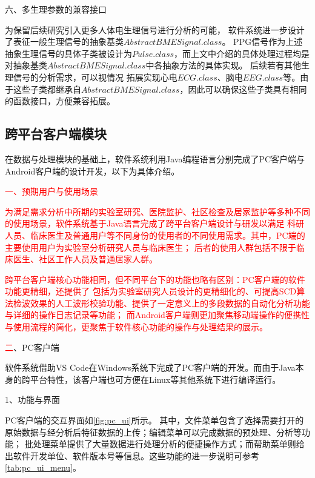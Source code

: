六、多生理参数的兼容接口

为保留后续研究引入更多人体电生理信号进行分析的可能，
软件系统进一步设计了表征一般生理信号的抽象基类$AbstractBMESignal.class$。
PPG信号作为上述抽象生理信号的具体子类被设计为$Pulse.class$，而上文中介绍的具体处理过程均是对抽象基类$AbstractBMESignal.class$中各抽象方法的具体实现。
后续若有其他生理信号的分析需求，可以视情况
拓展实现心电$ECG.class$、脑电$EEG.class$等。由于这些子类都继承自$AbstractBMESignal.class$，因此可以确保这些子类具有相同的函数接口，方便兼容拓展。

\subsection{跨平台客户端模块}

在数据与处理模块的基础上，软件系统利用Java编程语言分别完成了PC客户端与Android客户端的设计开发，以下为具体介绍。

\textcolor{red}{一、预期用户与使用场景}

\textcolor{red}{
为满足需求分析中所期的实验室研究、医院监护、社区检查及居家监护等多种不同的使用场景，软件系统基于Java语言完成了跨平台客户端设计与研发以满足
科研人员、临床医生及普通用户等不同身份的使用者的不同使用需求。其中，PC端的主要使用用户为实验室分析研究人员与临床医生；
后者的使用人群包括不限于临床医生、社区工作人员及普通居家人群。}

\textcolor{red}{跨平台客户端核心功能相同，但不同平台下的功能也略有区别：PC客户端的软件功能更精细，还提供了
包括为实验室研究人员设计的更精细化的、可提高SCD算法检波效果的人工波形校验功能、提供了一定意义上的多段数据的自动化分析功能与详细的操作日志记录等功能；
而Android客户端则更加聚焦移动端操作的便携性与使用流程的简化，更聚焦于软件核心功能的操作与处理结果的展示。
}

\textcolor{red}{二}、PC客户端

软件系统借助VS Code在Windows系统下完成了PC客户端的开发。而由于Java本身的跨平台特性\cite{openjdk}，该客户端也可方便在Linux等其他系统下进行编译运行。

1、功能与界面

PC客户端的交互界面如\autoref{fig:pc_ui}所示。%
其中，文件菜单包含了选择需要打开的原始数据与经分析后特征数据的上传；编辑菜单可以完成数据的预处理、分析等功能；
批处理菜单提供了大量数据进行处理分析的便捷操作方式；而帮助菜单则给出软件开发单位、软件版本号等信息。这些功能的进一步说明可参考\autoref{tab:pc_ui_menu}。

